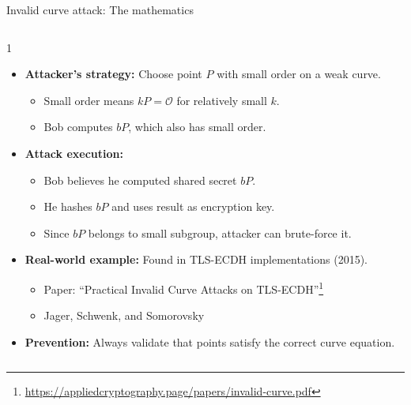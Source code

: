 \documentclass[aspectratio=169, lualatex, handout]{beamer}
\begin{document}
\begin{frame}{Invalid curve attack: The mathematics}
	\begin{columns}[c]
		\begin{column}{1\textwidth}
			\begin{itemize}[<+->]
				\item \textbf{Attacker's strategy:} Choose point $P$ with small order on a weak curve.
				      \begin{itemize}
					      \item Small order means $kP = \mathcal{O}$ for relatively small $k$.
					      \item Bob computes $bP$, which also has small order.
				      \end{itemize}
				\item \textbf{Attack execution:}
				      \begin{itemize}
					      \item Bob believes he computed shared secret $bP$.
					      \item He hashes $bP$ and uses result as encryption key.
					      \item Since $bP$ belongs to small subgroup, attacker can brute-force it.
				      \end{itemize}
				\item \textbf{Real-world example:} Found in TLS-ECDH implementations (2015).
				      \begin{itemize}
					      \item Paper: ``Practical Invalid Curve Attacks on TLS-ECDH''\footnote{\url{https://appliedcryptography.page/papers/invalid-curve.pdf}}
					      \item Jager, Schwenk, and Somorovsky
				      \end{itemize}
				\item \textbf{Prevention:} Always validate that points satisfy the correct curve equation.
			\end{itemize}
		\end{column}
	\end{columns}
\end{frame}
\end{document}
